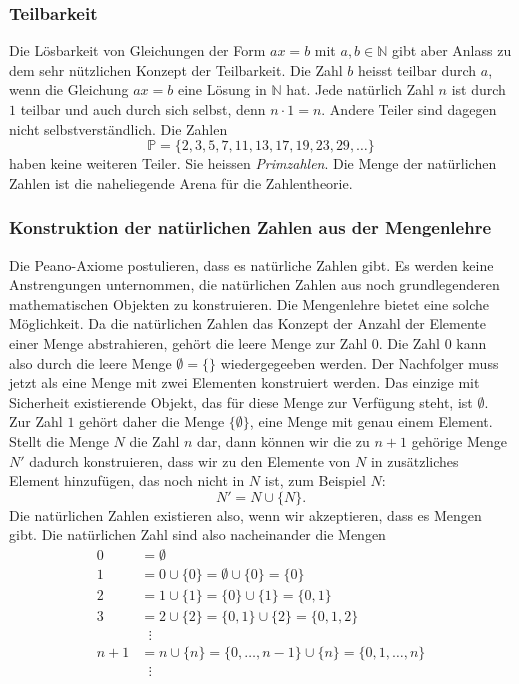 \subsubsection{Teilbarkeit}
Die Lösbarkeit von Gleichungen der Form $ax=b$ mit $a,b\in\mathbb{N}$
gibt aber Anlass zu dem sehr nützlichen Konzept der Teilbarkeit.
%
Die Zahl $b$ heisst teilbar durch $a$, wenn die Gleichung $ax=b$ eine
Lösung in $\mathbb{N}$ hat.
%
Jede natürlich Zahl $n$ ist durch $1$ teilbar und auch durch sich selbst,
denn $n\cdot 1 = n$.
Andere Teiler sind dagegen nicht selbstverständlich.
Die Zahlen
\[
\mathbb{P}
=
\{2,3,5,7,11,13,17,19,23,29,\dots\}
\]
haben keine weiteren Teiler. Sie heissen {\em Primzahlen}.
%
Die Menge der natürlichen Zahlen ist die naheliegende Arena
für die Zahlentheorie.
%

\subsubsection{Konstruktion der natürlichen Zahlen aus der Mengenlehre}
Die Peano-Axiome postulieren, dass es natürliche Zahlen gibt.
Es werden keine Anstrengungen unternommen, die natürlichen Zahlen
aus noch grundlegenderen mathematischen Objekten zu konstruieren.
Die Mengenlehre bietet eine solche Möglichkeit.
Da die natürlichen Zahlen das Konzept der Anzahl der Elemente einer
Menge abstrahieren, gehört die leere Menge zur Zahl $0$.
Die Zahl $0$ kann also durch die leere Menge $\emptyset = \{\}$
wiedergegeeben werden.
Der Nachfolger muss jetzt als eine Menge mit zwei Elementen konstruiert
werden.
Das einzige mit Sicherheit existierende Objekt, das für diese Menge
zur Verfügung steht, ist $\emptyset$.
Zur Zahl $1$ gehört daher die Menge $\{\emptyset\}$, eine Menge mit
genau einem Element.
Stellt die Menge $N$ die Zahl $n$ dar, dann können wir die zu $n+1$
gehörige Menge $N'$ dadurch konstruieren, dass wir zu den Elemente
von $N$ in zusätzliches Element hinzufügen, das noch nicht in $N$ ist,
zum Beispiel $N$:
\[
N' = N \cup \{ N \}.
\]
Die natürlichen Zahlen existieren also, wenn wir akzeptieren, dass es
Mengen gibt.
Die natürlichen Zahl sind also nacheinander die Mengen
\begin{align*}
0 &= \emptyset 
\\
1 &= 0 \cup \{0\} = \emptyset \cup \{0\} = \{0\}
\\
2 &= 1 \cup \{ 1\} = \{0\}\cup\{1\} = \{0,1\}
\\
3 &= 2 \cup \{ 2\} = \{0,1\}\cup \{2\} = \{0,1,2\}
\\
&\phantom{n}\vdots
\\
n+1&= n \cup \{n\} = \{0,\dots,n-1\} \cup \{n\} = \{0,1,\dots,n\}
\\
&\phantom{n}\vdots
\end{align*}





